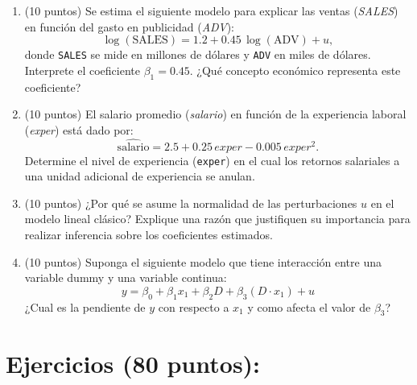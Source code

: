 \documentclass[10pt,a4paper]{article}
\begin{document}
\begin{enumerate}
    \item (10 puntos) Se estima el siguiente modelo para explicar las ventas (\emph{SALES})
        en función del gasto en publicidad (\emph{ADV}):
        \[
          \log(\text{SALES})
          = 1.2 + 0.45\,\log(\text{ADV}) + u ,
        \]
        donde \texttt{SALES} se mide en millones de dólares y \texttt{ADV}
        en miles de dólares. Interprete el coeficiente \(\beta_1 = 0.45\). ¿Qué concepto económico representa este coeficiente?

        
\item (10 puntos) El salario promedio (\emph{salario}) en función de la experiencia laboral
        (\emph{exper}) está dado por:
        \[
          \widehat{\text{salario}}
          = 2.5 + 0.25\,exper - 0.005\,exper^2 .
        \]
        Determine el nivel de experiencia (\texttt{exper}) en el cual los
                retornos salariales a una unidad adicional de experiencia
                se anulan.



\item (10 puntos) ¿Por qué se asume la normalidad de las perturbaciones \(u\)
        en el modelo lineal clásico? Explique una razón   que justifiquen su importancia para realizar inferencia
        sobre los coeficientes estimados.
        


\item (10 puntos) Suponga el siguiente modelo que tiene interacción entre una variable dummy y una variable continua:
$$y = \beta_0 + \beta_1 x_1 + \beta_2D+\beta_3(D\cdot x_1)+u$$
¿Cual es la pendiente de $y$ con respecto a $x_1$ y como afecta el valor de $\beta_3$?


\end{enumerate}

\section{Ejercicios (80 puntos):}
\end{document}
